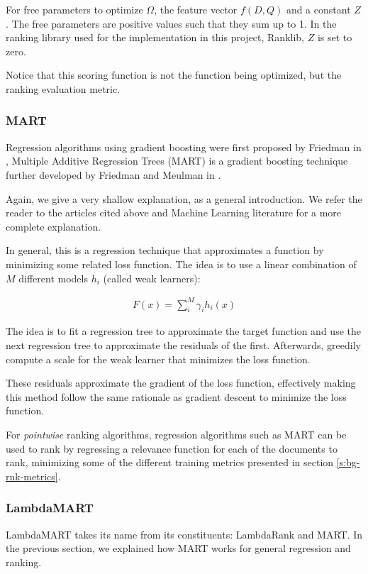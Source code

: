 For free parameters to optimize $\Omega$, the feature vector $f(D, Q)$ and a constant $Z$. The free parameters are positive 
values such that they sum up to 1. In the ranking library used for the implementation in this project, Ranklib, $Z$ is set to zero.

Notice that this scoring function is not the function being optimized, but the ranking evaluation metric.

\subsubsection{MART}
Regression algorithms using gradient boosting were first proposed by Friedman in \cite{Friedman2001GreedyFA},
Multiple Additive Regression Trees (MART) is a gradient boosting technique further developed by Friedman and
Meulman in \cite{Friedman2003MultipleAR}.

Again, we give a very shallow explanation, as a general introduction. We refer the reader to the articles
cited above and Machine Learning literature for a more complete explanation.

In general, this is a regression technique that approximates a function by minimizing some related loss 
function. The idea is to use a linear combination of $M$ different models $h_i$ (called weak learners):

\begin{align*}
F(x) = \sum_{i}^M \gamma_i h_i(x)
\end{align*}

The idea is to fit a regression tree to approximate the target function and use the next regression tree to
approximate the residuals of the first. Afterwards, greedily compute a scale for the weak learner that minimizes
the loss function.

These residuals approximate the gradient of the loss function, effectively making this method follow the same
rationale as gradient descent to minimize the loss function.

For \emph{pointwise} ranking algorithms, regression algorithms such as MART can be used to rank
by regressing a relevance function for each of the documents to rank, minimizing some of the 
different training metrics presented in section \ref{s:bg-rnk-metrics}.

\subsubsection{LambdaMART}
LambdaMART takes its name from its constituents: LambdaRank and MART. In the previous section, we 
explained how MART works for general regression and ranking.

